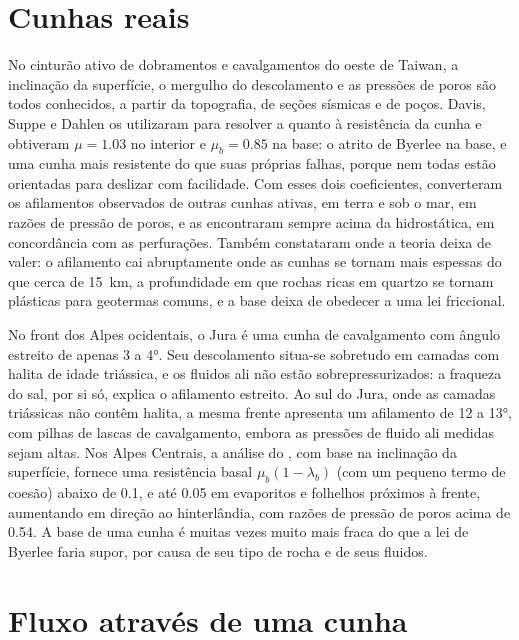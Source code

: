 \section{Cunhas reais}\label{sec:b3:orogenic-wedges:real}

No cinturão ativo de dobramentos e cavalgamentos do oeste de Taiwan, a inclinação da superfície, o
mergulho do descolamento e as pressões de poros são todos conhecidos, a partir da topografia,
de seções sísmicas e de poços. Davis, Suppe e Dahlen os utilizaram para resolver a
 quanto à resistência da cunha e obtiveram $\mu = 1.03$
no interior e $\mu_b = 0.85$ na base: o atrito de Byerlee na base, e uma
cunha mais resistente do que suas próprias falhas, porque nem todas estão orientadas para deslizar
com facilidade. Com esses dois coeficientes, converteram os afilamentos observados de outras
cunhas ativas, em terra e sob o mar, em razões de pressão de poros, e as encontraram
sempre acima da hidrostática, em concordância com as perfurações. Também constataram
onde a teoria deixa de valer: o afilamento cai abruptamente onde as cunhas se tornam mais espessas
do que cerca de \qty{15}{km}, a profundidade em que rochas ricas em quartzo se tornam plásticas
para geotermas comuns, e a base deixa de obedecer a uma lei friccional.

No front dos Alpes ocidentais, o Jura é uma cunha de cavalgamento com ângulo estreito
de apenas 3 a \ang{4}. Seu descolamento situa-se sobretudo em camadas com halita
de idade triássica, e os fluidos ali não estão sobrepressurizados: a
fraqueza do sal, por si só, explica o afilamento estreito. Ao sul do Jura, onde as
camadas triássicas não contêm halita, a mesma frente apresenta um afilamento de 12 a
\ang{13}, com pilhas de lascas de cavalgamento, embora as pressões de fluido ali medidas
sejam altas. Nos Alpes Centrais, a análise do , com base na
inclinação da superfície, fornece uma resistência basal $\mu_b(1 - \lambda_b)$ (com um pequeno termo de
coesão) abaixo de 0.1, e até 0.05 em evaporitos e folhelhos próximos à frente,
aumentando em direção ao hinterlândia, com razões de pressão de poros acima de 0.54. A
base de uma cunha é muitas vezes muito mais fraca do que a lei de Byerlee faria supor, por causa de seu
tipo de rocha e de seus fluidos.

\section{Fluxo através de uma cunha}\label{sec:b3:orogenic-wedges:flux}

